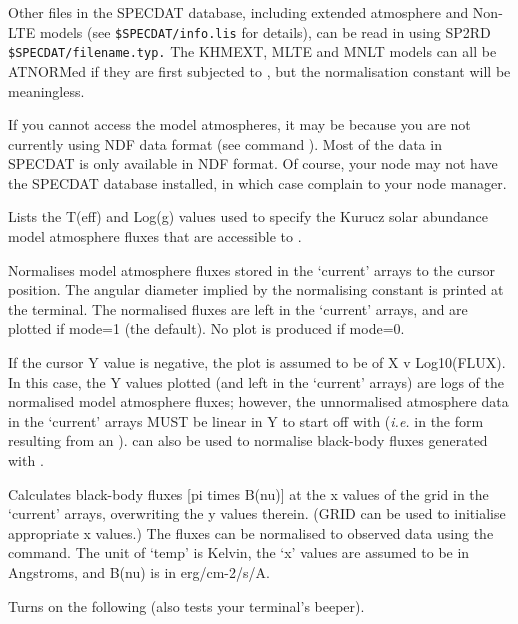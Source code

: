 \begin {description}
Other files in the SPECDAT database, including extended atmosphere and
Non-LTE models (see {\tt{\$SPECDAT/info.lis}}  for details), can be read in
using SP2RD {\tt{\$SPECDAT/file\-name.typ.}}  The KHMEXT, MLTE and MNLT
models can all be ATNORMed if they are first subjected to ,  but
the normalisation constant will be meaningless.

If you cannot access the model atmospheres, it may be because you are not
currently using NDF data format (see command ).  Most of the data in
SPECDAT is only available in NDF format. Of course, your node may not have the
SPECDAT database installed, in which case complain to your node manager.

Lists the T(eff) and Log(g) values used to specify the Kurucz solar
abundance model atmosphere fluxes that are accessible to . 

Normalises model atmosphere fluxes stored in the `current' arrays to
the cursor position. The angular diameter implied by the normalising
constant is printed at the terminal. The normalised fluxes are left in
the `current' arrays, and are plotted if mode=1 (the default). No plot
is produced if mode=0.

If the cursor Y value is negative, the plot is assumed to be of X v
Log10(FLUX). In this case, the Y values plotted (and left in the
`current' arrays) are logs of the normalised model atmosphere fluxes;
however, the unnormalised atmosphere data in the `current' arrays MUST
be linear in Y to start off with ({\em i.e.} in the form resulting
from an ).    can also be used to normalise black-body
fluxes generated with . 

Calculates black-body fluxes [pi times B(nu)] at the x values of the
grid in the `current' arrays, overwriting the y values therein. (GRID
can be used to initialise appropriate x values.) The fluxes can be
normalised to observed data using the   command. The unit of
`temp' is Kelvin, the `x' values are assumed to be in Angstroms, and
B(nu) is in erg/cm-2/s/A.

Turns on the   following   (also tests your terminal's beeper).


\end{description}
